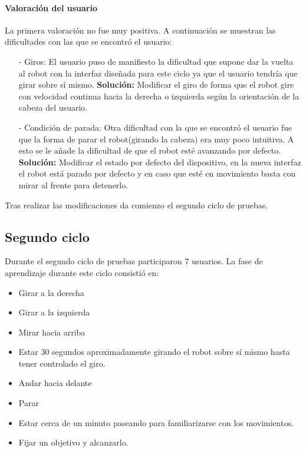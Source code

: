 \documentclass[twoside, 11pt]{epstfg}
\begin{document}
\paragraph{Valoración del usuario}
La primera valoración no fue muy positiva. A continuación se muestran las dificultades con las que se encontró el usuario:

\begin{itemize}
	\item [ - ] Giros: El usuario puso de manifiesto la dificultad que supone dar la vuelta al robot con la interfaz diseñada para este ciclo ya que el usuario tendría que girar sobre sí mismo.
	\subitem \textbf{Solución:} Modificar el giro de forma que el robot gire con velocidad continua hacia la derecha o izquierda según la orientación de la cabeza del usuario. 
	\item [ - ] Condición de parada: Otra dificultad con la que se encontró el usuario fue que la forma de parar el robot(girando la cabeza) era muy poco intuitiva.  A esto se le añade la dificultad de que el robot esté avanzando por defecto.
	\subitem \textbf{Solución:} Modificar el estado por defecto del dispositivo, en la nueva interfaz el robot está parado por defecto y en caso que esté en movimiento basta con mirar al frente para detenerlo.
\end{itemize}

Tras realizar las modificaciones da comienzo el segundo ciclo de pruebas.

\subsection{Segundo ciclo}

Durante el segundo ciclo de pruebas participaron 7 usuarios.
La fase de aprendizaje durante este ciclo consistió en:

\begin{itemize}
	\item Girar a la derecha
	\item Girar a la izquierda
	\item Mirar hacia arriba
	\item Estar 30 segundos aproximadamente girando el robot sobre sí mismo hasta tener controlado el giro.
	\item Andar hacia delante
	\item Parar
	\item Estar cerca de un minuto paseando para familiarizarse con los movimientos.
	\item Fijar un objetivo y alcanzarlo.
\end{itemize}
\end{document}
